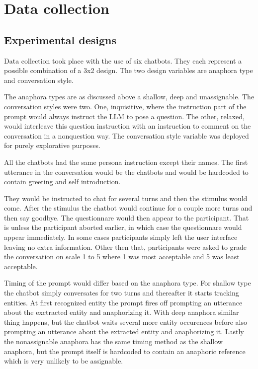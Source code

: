 
\section{Data collection}

\subsection{Experimental designs}

Data collection took place with the use of six chatbots.
They each represent a possible combination of a 3x2 design.
The two design variables are anaphora type and conversation style.

The anaphora types are as discussed above a shallow, deep and unassignable.
The conversation styles were two. One, inquisitive,
where the instruction part of the prompt
would always instruct the LLM to pose a question.
The other, relaxed, would interleave this question instruction with
an instruction to comment on the conversation in a nonquestion way.
The conversation style variable was deployed for purely explorative purposes.

All the chatbots had the same persona instruction except their names.
The first utterance in the conversation would be the chatbots and
would be hardcoded to contain greeting and self introduction.

They would be instructed to chat for several turns and then the stimulus would come.
After the stimulus the chatbot would continue for a couple more turns and then say goodbye.
The questionnare would then appear to the participant.
That is unless the participant aborted earlier, in which case the questionnare would appear immediately.
In some cases participants simply left the user interface leaving no extra information.
Other then that, participants were asked to grade the conversation on scale 1 to 5
where 1 was most acceptable and 5 was least acceptable.

Timing of the prompt would differ based on the anaphora type.
For shallow type the chatbot simply conversates for two turns and thereafter it starts tracking entities.
At first recognized entity the prompt fires off
prompting an utterance about the exctracted entity and anaphorizing it.
With deep anaphora similar thing happens,
but the chatbot waits several more entity occurences
before also prompting an utterance about the extracted entity and anaphorizing it.
Lastly the nonassignable anaphora has the same timing method as the shallow anaphora,
but the prompt itself is hardcoded to contain an anaphoric reference which is
very unlikely to be assignable.


